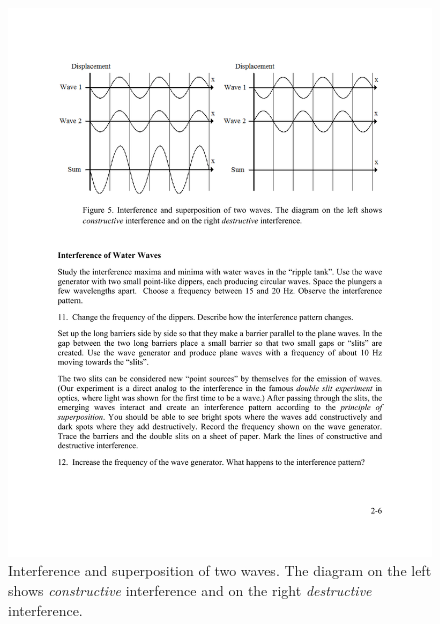 \documentclass[11pt]{NSF}
\begin{document}
%
\begin{figure}[hbtp]
\begin{center}
\includegraphics[width=.95\textwidth]{fig2_5}
\caption{Interference and superposition of two waves. 
The diagram on the left
shows {\em constructive} interference and on the right 
{\em destructive} interference.}
\label{f:5}
\end{center}
\end{figure}
%
\end{document}

